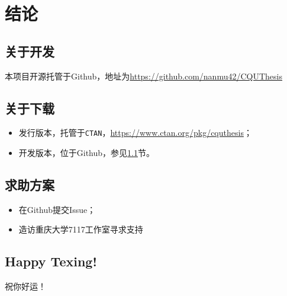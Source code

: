 \chapter{结论}
\section{关于开发}\label{sec:dev}
本项目开源托管于Github，地址为\url{https://github.com/nanmu42/CQUThesis}
\section{关于下载}
\begin{itemize}
	\item 发行版本，托管于\texttt{CTAN}，\url{https://www.ctan.org/pkg/cquthesis}；
	\item 开发版本，位于Github，参见\ref{sec:dev}节。
\end{itemize}
\section{求助方案}
\begin{itemize}
	\item 在Github提交Issue；
	\item 造访重庆大学7117工作室寻求支持
\end{itemize}
\section{Happy Texing!}
祝你好运！